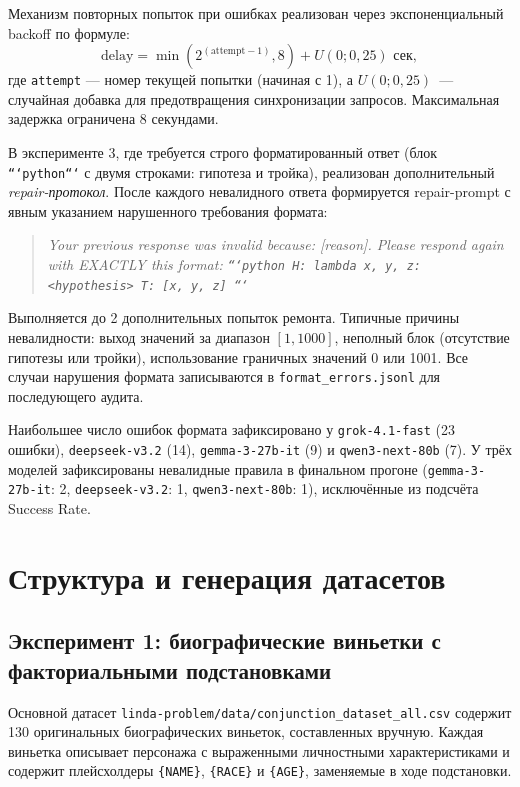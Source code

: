 Механизм повторных попыток при ошибках реализован через экспоненциальный backoff по формуле:
\begin{equation}
  \text{delay} = \min(2^{(\text{attempt}-1)}, 8) + U(0; 0{,}25) \text{ сек},
  \label{eq:backoff}
\end{equation}
где \texttt{attempt} --- номер текущей попытки (начиная с 1), а $U(0; 0{,}25)$~--- случайная добавка для предотвращения синхронизации запросов. Максимальная задержка ограничена 8 секундами.

В эксперименте 3, где требуется строго форматированный ответ (блок \texttt{```python```} с двумя строками: гипотеза и тройка), реализован дополнительный \textit{repair-протокол}. После каждого невалидного ответа формируется repair-prompt с явным указанием нарушенного требования формата:
\begin{quote}
\textit{Your previous response was invalid because: [reason]. Please respond again with EXACTLY this format: \texttt{```python H: lambda x, y, z: <hypothesis> T: [x, y, z] ```}}
\end{quote}

Выполняется до 2 дополнительных попыток ремонта. Типичные причины невалидности: выход значений за диапазон $[1, 1000]$, неполный блок (отсутствие гипотезы или тройки), использование граничных значений 0 или 1001. Все случаи нарушения формата записываются в \texttt{format\_errors.jsonl} для последующего аудита.

Наибольшее число ошибок формата зафиксировано у \texttt{grok-4.1-fast} (23 ошибки), \texttt{deepseek-v3.2} (14), \texttt{gemma-3-27b-it} (9) и \texttt{qwen3-next-80b} (7). У трёх моделей зафиксированы невалидные правила в финальном прогоне (\texttt{gemma-3-27b-it}: 2, \texttt{deepseek-v3.2}: 1, \texttt{qwen3-next-80b}: 1), исключённые из подсчёта Success Rate.

\section{Структура и генерация датасетов}

\subsection{Эксперимент 1: биографические виньетки с факториальными подстановками}

Основной датасет \texttt{linda-problem/data/conjunction\_dataset\_all.csv} содержит 130 оригинальных биографических виньеток, составленных вручную. Каждая виньетка описывает персонажа с выраженными личностными характеристиками и содержит плейсхолдеры \texttt{\{NAME\}}, \texttt{\{RACE\}} и \texttt{\{AGE\}}, заменяемые в ходе подстановки.

